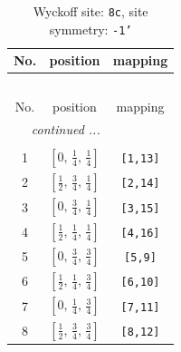 \documentclass[fleqn,8pt]{jsarticle}
\begin{document}
\renewcommand{\arraystretch}{1.2}
\begin{longtable}{ccc}
\caption{Wyckoff site: {\tt 8c}, site symmetry: {\tt -1'}}
 \\
 \hline \hline
No. & position & mapping \\ \hline \endfirsthead

\multicolumn{2}{l}{\tablename\ \thetable{}} \\
 \hline \hline
No. & position & mapping \\ \hline \endhead

 \hline \hline
\multicolumn{2}{r}{\footnotesize\it continued ...} \\ \endfoot

 \hline \hline
\multicolumn{2}{r}{} \\ \endlastfoot

1 & $\left[ 0,\, \frac{1}{4},\, \frac{1}{4} \right]$ & {\tt [1,13]} \\ \hline
2 & $\left[ \frac{1}{2},\, \frac{3}{4},\, \frac{1}{4} \right]$ & {\tt [2,14]} \\ \hline
3 & $\left[ 0,\, \frac{3}{4},\, \frac{1}{4} \right]$ & {\tt [3,15]} \\ \hline
4 & $\left[ \frac{1}{2},\, \frac{1}{4},\, \frac{1}{4} \right]$ & {\tt [4,16]} \\ \hline
5 & $\left[ 0,\, \frac{3}{4},\, \frac{3}{4} \right]$ & {\tt [5,9]} \\ \hline
6 & $\left[ \frac{1}{2},\, \frac{1}{4},\, \frac{3}{4} \right]$ & {\tt [6,10]} \\ \hline
7 & $\left[ 0,\, \frac{1}{4},\, \frac{3}{4} \right]$ & {\tt [7,11]} \\ \hline
8 & $\left[ \frac{1}{2},\, \frac{3}{4},\, \frac{3}{4} \right]$ & {\tt [8,12]} \\
\end{longtable}
\renewcommand{\arraystretch}{1.2}
\end{document}
